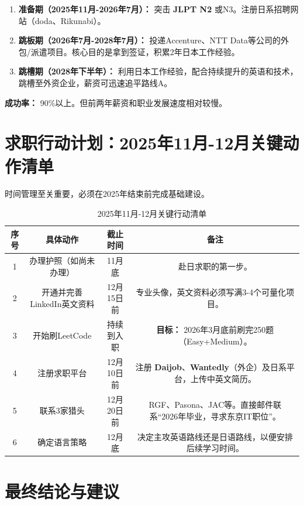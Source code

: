 \documentclass[12pt, a4paper]{ctexart}
\begin{document}
\begin{enumerate}
    \item \textbf{准备期（2025年11月-2026年7月）：} 突击 \textbf{JLPT N2} 或N3。注册日系招聘网站（doda、Rikunabi）。
    \item \textbf{跳板期（2026年7月-2028年7月）：} 投递Accenture、NTT Data等公司的外包/派遣项目。核心目的是拿到签证，积累2年日本工作经验。
    \item \textbf{跳槽期（2028年下半年）：} 利用日本工作经验，配合持续提升的英语和技术，跳槽至外资企业，薪资可迅速追平路线A。
\end{enumerate}
\textbf{成功率：} 90\%以上。但前两年薪资和职业发展速度相对较慢。

\section{求职行动计划：2025年11月-12月关键动作清单}

时间管理至关重要，必须在2025年结束前完成基础建设。

\begin{table}[h]
    \centering
    \caption{2025年11月-12月关键行动清单}
    \label{tab:action_plan}
    \begin{tabular}{cccc}
        \toprule
        \textbf{序号} & \textbf{具体动作} & \textbf{截止时间} & \textbf{备注} \\
        \midrule
        1 & 办理护照（如尚未办理） & 11月底 & 赴日求职的第一步。 \\
        2 & 开通并完善LinkedIn英文资料 & 12月15日前 & 专业头像，英文资料必须写满3-4个可量化项目。 \\
        3 & 开始刷LeetCode & 持续到入职 & \textbf{目标：} 2026年3月底前刷完250题（Easy+Medium）。 \\
        4 & 注册求职平台 & 12月10日前 & 注册 \textbf{Daijob}、\textbf{Wantedly}（外企）及日系平台，上传中英文简历。 \\
        5 & 联系3家猎头 & 12月20日前 & RGF、Pasona、JAC等。直接邮件联系“2026年毕业，寻求东京IT职位”。 \\
        6 & 确定语言策略 & 12月底 & 决定主攻英语路线还是日语路线，以便安排后续学习时间。 \\
        \bottomrule
    \end{tabular}
\end{table}

\section{最终结论与建议}
\end{document}
